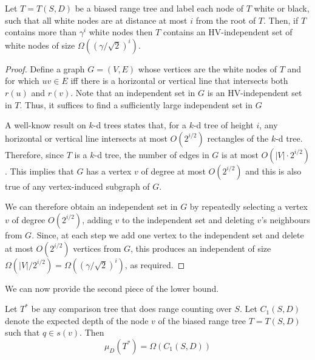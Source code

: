 \documentclass[lotsofwhite,charterfonts]{patmorin}
\begin{document}
\begin{lem}
Let $T=T(S,D)$ be a biased range tree and label each node of $T$ white
or black, such that all white nodes are at distance at most $i$ from
the root of $T$.  Then, if $T$ contains more than $\gamma^i$ white nodes
then $T$ contains an HV-independent set of white nodes of size
$\Omega((\gamma/\sqrt{2})^i)$.
\end{lem}

\begin{proof}
Define a graph $G=(V,E)$ whose vertices are the white nodes of $T$ and
for which $uv\in E$ iff there is a horizontal or vertical line that
intersects both $r(u)$ and $r(v)$.  Note that an independent set in
$G$ is an HV-independent set in $T$.  Thus, it suffices to find a
sufficiently large independent set in $G$

A well-know result on $k$-d trees states that, for a $k$-d tree of
height $i$, any horizontal or vertical line intersects at most
$O(2^{i/2})$ rectangles of the $k$-d tree. Therefore, since $T$ is a
$k$-d tree, the number of edges in $G$ is at most $O(|V|\cdot
2^{i/2})$.  This implies that $G$ has a vertex $v$ of degree at most
$O(2^{i/2})$ and this is also true of any vertex-induced subgraph of
$G$.

We can therefore obtain an independent set in $G$ by repeatedly
selecting a vertex $v$ of degree $O(2^{i/2})$, adding $v$ to the
independent set and deleting $v$'s neighbours from $G$.  Since, at
each step we add one vertex to the independent set and delete at most
$O(2^{i/2})$ vertices from $G$, this produces an independent of size
$\Omega(|V|/2^{i/2}) = \Omega((\gamma/\sqrt{2})^i)$, as required.
\end{proof}

We can now provide the second piece of the lower bound.

\begin{lem}
Let $T^*$ be any comparison tree that does range counting over $S$. Let
$C_1(S,D)$ denote the expected depth of the node $v$ of the biased
range tree $T=T(S,D)$ such that $q\in s(v)$.  Then
\[
    \mu_D(T^*) = \Omega(C_1(S,D))
\]
\end{lem}
\end{document}
